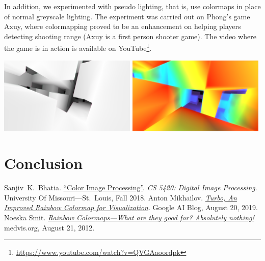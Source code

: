 \documentclass[a4paper,12pt]{article}
\begin{document}
In addition, we experimented with pseudo lighting, that is, use colormaps
in place of normal greyscale lighting.  The experiment was carried out on
Phong's game Axuy, where colormapping proved to be an enhancement on helping
players detecting shooting range (Axuy is a first person shooter game).
The video where the game is in action is available on
YouTube\footnote{\url{https://www.youtube.com/watch?v=QVGAaoordpk}}.
\begin{center}
  \includegraphics[width=0.49\textwidth]{axuy-grey.png}
  \includegraphics[width=0.49\textwidth]{axuy-turbo.png}
\end{center}

\section{Conclusion}

\begin{thebibliography}{69}
   Sanjiv~K.~Bhatia.
    \href{http://www.cs.umsl.edu/~sanjiv/classes/cs5420/lectures/color.pdf}
         {``Color Image Processing''}.
    \emph{CS 5420: Digital Image Processing}.
    University Of Missouri---St.~Louis, Fall 2018.
   Anton Mikhailov.
    \href{https://ai.googleblog.com/2019/08/turbo-improved-rainbow-colormap-for.html}
         {\emph{Turbo, An Improved Rainbow Colormap for Visualization}}.
    Google AI Blog, August 20, 2019.
   Noeska Smit.
    \href{https://medvis.org/2012/08/21/rainbow-colormaps-what-are-they-good-for-absolutely-nothing/}
         {\emph{Rainbow Colormaps---What are they good for? Absolutely nothing!}}
    medvis.org, August 21, 2012.
\end{thebibliography}
\end{document}
